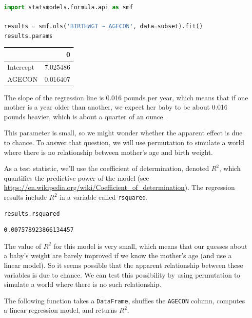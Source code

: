 \begin{lstlisting}[language=Python,style=source]
import statsmodels.formula.api as smf

results = smf.ols('BIRTHWGT ~ AGECON', data=subset).fit()
results.params
\end{lstlisting}

\begin{tabular}{lr}
\toprule
{} &         0 \\
\midrule
Intercept &  7.025486 \\
AGECON    &  0.016407 \\
\bottomrule
\end{tabular}

The slope of the regression line is 0.016 pounds per year, which means
that if one mother is a year older than another, we expect her baby to
be about 0.016 pounds heavier, which is about a quarter of an ounce.

This parameter is small, so we might wonder whether the apparent effect
is due to chance. To answer that question, we will use permutation to
simulate a world where there is no relationship between mother's age and
birth weight.

As a test statistic, we'll use the coefficient of determination, denoted
\(R^2\), which quantifies the predictive power of the model (see
\url{https://en.wikipedia.org/wiki/Coefficient_of_determination}). The
regression results include \(R^2\) in a variable called
\passthrough{\lstinline!rsquared!}.

\begin{lstlisting}[language=Python,style=source]
results.rsquared
\end{lstlisting}

\begin{lstlisting}[style=output]
0.007578923866134457
\end{lstlisting}

The value of \(R^2\) for this model is very small, which means that our
guesses about a baby's weight are barely improved if we know the
mother's age (and use a linear model). So it seems possible that the
apparent relationship between these variables is due to chance. We can
test this possibility by using permutation to simulate a world where
there is no such relationship.

The following function takes a \passthrough{\lstinline!DataFrame!},
shuffles the \passthrough{\lstinline!AGECON!} column, computes a linear
regression model, and returns \(R^2\).

